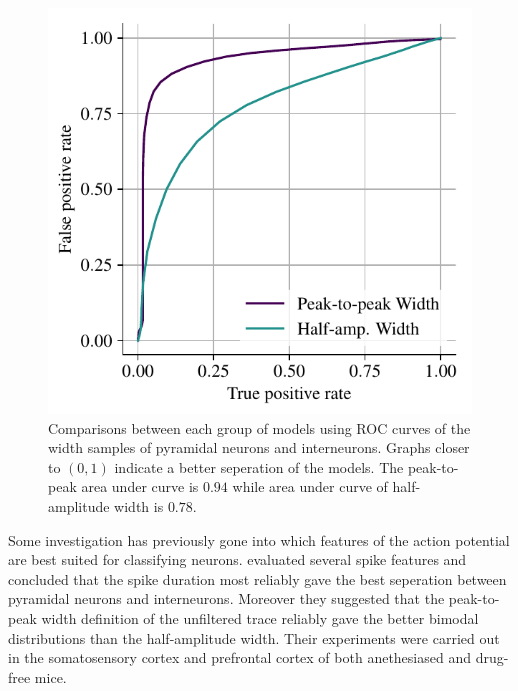 \documentclass[altfont, fleqn]{uiophd}
\begin{document}
\begin{figure}
    \vspace{-20pt}
    \begin{center}
        \includegraphics[width=\linewidth]{images/sec_4/roc_curves.pdf}
        \vspace{-20pt}
        \caption{%
            Comparisons between each group of models using ROC curves
            of the width samples of pyramidal neurons and interneurons. 
            Graphs closer to $(0,1)$ indicate a better seperation
            of the models. 
            The peak-to-peak area under curve is $0.94$ while
            area under curve of half-amplitude width is $0.78$.
            }
        \label{fig:4_roc_curves}
        \vspace{-10pt}
    \end{center}
\end{figure}

Some investigation has previously gone into which features of 
the action potential 
are best suited
for classifying neurons. 
\Textcite{bartho_characterization_2004}
evaluated several spike features and 
concluded that
the spike duration most reliably gave the best seperation between pyramidal neurons and
interneurons. 
Moreover they suggested that the peak-to-peak width definition
of the unfiltered trace reliably gave the better bimodal distributions
than the half-amplitude width. 
Their experiments were carried out in
the somatosensory cortex and prefrontal cortex of both anethesiased
and drug-free mice.
\newline
\end{document}
